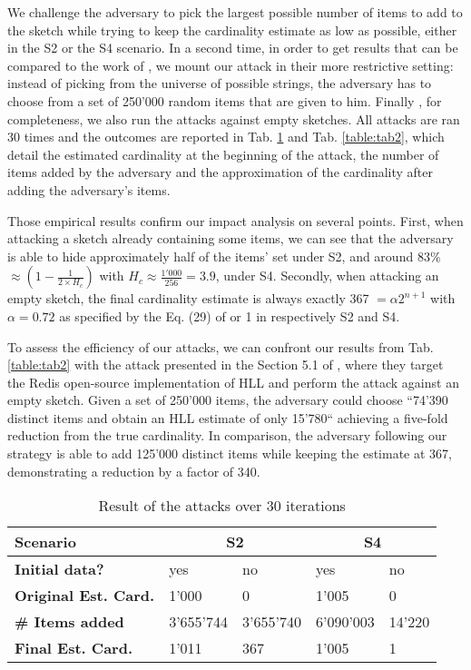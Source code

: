 \documentclass{IEEEtran}
\begin{document}
We challenge the adversary to pick the largest possible number of items to add to the sketch while trying to keep the cardinality estimate as low as possible, either in the S2 or the S4 scenario. In a second time, in order to get results that can be compared to the work of \cite{hllvuln}, we mount our attack in their more restrictive setting: instead of picking from the universe of possible strings, the adversary has to choose from a set of 250'000 random items that are given to him. Finally , for completeness, we also run the attacks against empty sketches. All attacks are ran 30 times and the outcomes are reported in Tab. \ref{table:tab1} and Tab. \ref{table:tab2}, which detail the estimated cardinality at the beginning of the attack, the number of items added by the adversary and the approximation of the cardinality after adding the adversary's items.

Those empirical results confirm our impact analysis on several points. First, when attacking a sketch already containing some items, we can see that the adversary is able to hide approximately half of the items' set under S2, and around 83\%%
$\approx (1-\frac{1}{2\times H_c})$ with $H_c\approx\frac{1'000}{256}=3.9$, under S4.
Secondly, when attacking an empty sketch, the final cardinality estimate is always exactly 367 $=\alpha2^{n+1}$ with $\alpha = 0.72$ as specified by the Eq. (29) of \cite{hll2} or 1 in respectively S2 and S4.

To assess the efficiency of our attacks, we can confront our results from Tab. \ref{table:tab2} with the attack presented in the Section 5.1 of \cite{hllvuln}, where they target the Redis \cite{redishll} open-source implementation of HLL and perform the attack against an empty sketch. Given a set of 250'000 items, the adversary could choose ``74'390 distinct items and obtain an HLL estimate of only 15'780`` achieving a five-fold reduction from the true cardinality. In comparison, the adversary following our strategy is able to add 125'000 distinct items while keeping the estimate at 367, demonstrating a reduction by a factor of 340. 

\begin{table}[h]
\caption{Result of the attacks over 30 iterations}
\begin{tabular}{| m{8.5em} | m{4em} | m{4em} | m{4em} | m{4em} |}
    \hline
    \textbf{Scenario} & \multicolumn{2}{c|}{S2} & \multicolumn{2}{c|}{S4} \\ \hline
    \textbf{Initial data?} & yes & no & yes & no \\ \hline
    \textbf{Original Est. Card.} & 1'000 & 0 & 1'005 & 0 \\ \hline
    \textbf{\# Items added} & 3'655'744 & 3'655'740 & 6'090'003 & 14'220 \\ \hline
    \textbf{Final Est. Card.} & 1'011 & 367 & 1'005 & 1 \\ \hline
\end{tabular}
\label{table:tab1}
\end{table}
\end{document}
